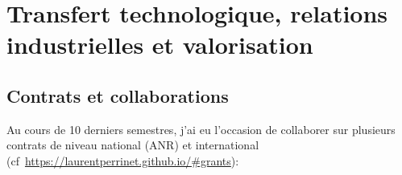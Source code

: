 \documentclass[10pt,french,a4paper,twoside]{article}%
\begin{document}
\section{Transfert technologique, relations industrielles et valorisation} %


\subsection{Contrats et collaborations} %
Au cours de 10 derniers semestres, j'ai eu l'occasion de collaborer sur plusieurs contrats de niveau national (ANR) et international (cf~\url{https://laurentperrinet.github.io/#grants}):
\end{document}
